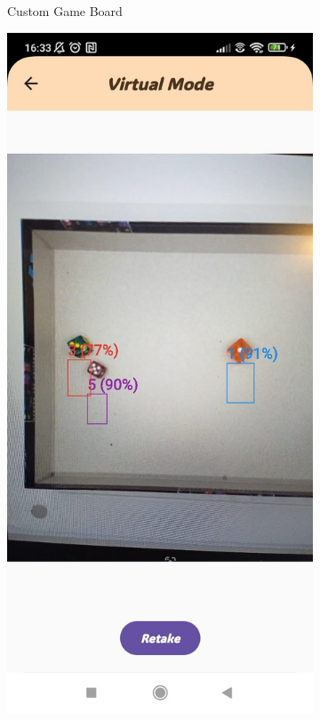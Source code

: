 \begin{figure}[ht!]
\begin{subfigure}[b]{0.27\textwidth}
        \caption{Custom Game Board}
    \end{subfigure}
    \hfill
    \begin{subfigure}[b]{0.27\textwidth}
        \includegraphics[width=\textwidth]{img/virtual screen2.jpg}

\end{subfigure}
\end{figure}

